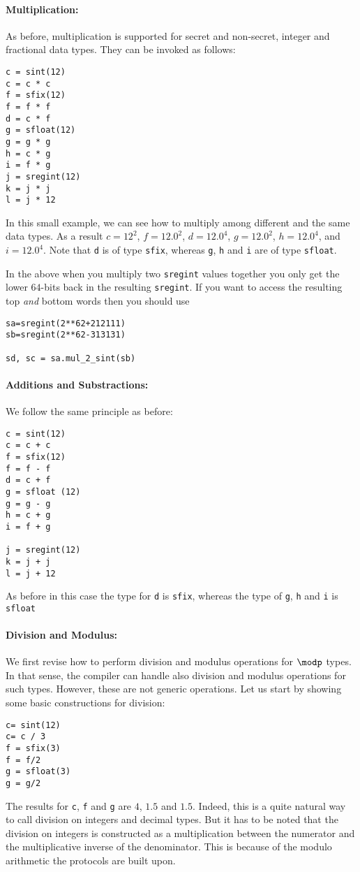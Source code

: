 \paragraph{Multiplication:}
As before, multiplication is supported for secret and non-secret,
integer and fractional data types. They can be invoked as follows:
\begin{lstlisting}
c = sint(12)
c = c * c
f = sfix(12)
f = f * f
d = c * f
g = sfloat(12)
g = g * g
h = c * g
i = f * g
j = sregint(12)
k = j * j
l = j * 12
\end{lstlisting}
In this small example, we can see how to multiply among different and the same data types.
As a result $c=12^2$, $f=12.0^{2}$, $d=12.0^{4}$, $g = 12.0^{2}$,
$h= 12.0^{4}$, and $i=12.0^{4} $. Note that \verb|d| is of type \verb|sfix|,
whereas \verb|g|, \verb|h| and \verb|i| are of type \verb|sfloat|.

In the above when you  multiply two \verb|sregint| values together you only
get the lower $64$-bits back in the resulting \verb|sregint|.
If you want to access the resulting top {\em and} bottom words then you
should use
\begin{lstlisting}
sa=sregint(2**62+212111)
sb=sregint(2**62-313131)

sd, sc = sa.mul_2_sint(sb)
\end{lstlisting}


\paragraph{Additions and Substractions:}
We follow the same principle as before:
\begin{lstlisting}
c = sint(12)
c = c + c
f = sfix(12)
f = f - f
d = c + f
g = sfloat (12)
g = g - g
h = c + g
i = f + g

j = sregint(12)
k = j + j
l = j + 12
\end{lstlisting}
As before in this case the type for \verb|d| is \verb|sfix|,
whereas the type of \verb|g|, \verb|h| and \verb|i| is \verb|sfloat|

\paragraph{Division and Modulus:}
We first revise how to perform division and modulus operations for $\modp$ types. In that sense, the compiler can handle also division and modulus operations for such types.
However, these are not generic operations.
Let us start by showing some basic constructions for division:
\begin{lstlisting}
c= sint(12)
c= c / 3
f = sfix(3)
f = f/2
g = sfloat(3)
g = g/2
\end{lstlisting}
The results for \verb|c|, \verb|f| and \verb|g| are $4$, $1.5$ and $1.5$.
Indeed, this is a quite natural way to call division on integers and decimal types.
But it has to be noted that the division on integers is constructed as a multiplication
between the numerator and the multiplicative inverse of the denominator.
This is because of the modulo arithmetic the protocols are built upon.

